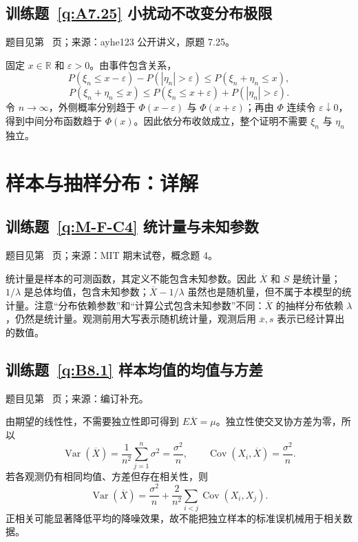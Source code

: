 \documentclass[UTF8,12pt,a4paper,fontset=fandol]{ctexbook}
\begin{document}
\subsection*{训练题~\ref{q:A7.25} 小扰动不改变分布极限}\label{a:A7.25}{\small 题目见第~\pageref{q:A7.25} 页；来源：ayhe123 公开讲义，原题 7.25。}
\begin{solve}固定 $x\in\mathbb R$ 和 $\varepsilon>0$。由事件包含关系，\[P(\xi_n\le x-\varepsilon)-P(|\eta_n|>\varepsilon)\le P(\xi_n+\eta_n\le x),\]\[P(\xi_n+\eta_n\le x)\le P(\xi_n\le x+\varepsilon)+P(|\eta_n|>\varepsilon).\]令 $n\to\infty$，外侧概率分别趋于 $\Phi(x-\varepsilon)$ 与 $\Phi(x+\varepsilon)$；再由 $\Phi$ 连续令 $\varepsilon\downarrow0$，得到中间分布函数趋于 $\Phi(x)$。因此依分布收敛成立，整个证明不需要 $\xi_n$ 与 $\eta_n$ 独立。\end{solve}

\clearpage\section*{样本与抽样分布：详解}

\subsection*{训练题~\ref{q:M-F-C4} 统计量与未知参数}\label{a:M-F-C4}{\small 题目见第~\pageref{q:M-F-C4} 页；来源：MIT 期末试卷，概念题 4。}
\begin{solve}统计量是样本的可测函数，其定义不能包含未知参数。因此 $\overline X$ 和 $S$ 是统计量；$1/\lambda$ 是总体均值，包含未知参数；$\overline X-1/\lambda$ 虽然也是随机量，但不属于本模型的统计量。注意“分布依赖参数”和“计算公式包含未知参数”不同：$\overline X$ 的抽样分布依赖 $\lambda$，仍然是统计量。观测前用大写表示随机统计量，观测后用 $\overline x,s$ 表示已经计算出的数值。\end{solve}

\subsection*{训练题~\ref{q:B8.1} 样本均值的均值与方差}\label{a:B8.1}{\small 题目见第~\pageref{q:B8.1} 页；来源：编订补充。}
\begin{solve}由期望的线性性，不需要独立性即可得到 $E\overline X=\mu$。独立性使交叉协方差为零，所以\[\operatorname{Var}(\overline X)=\frac{1}{n^2}\sum_{j=1}^n\sigma^2=\frac{\sigma^2}{n},\qquad\operatorname{Cov}(X_i,\overline X)=\frac{\sigma^2}{n}.\]若各观测仍有相同均值、方差但存在相关性，则\[\operatorname{Var}(\overline X)=\frac{\sigma^2}{n}+\frac{2}{n^2}\sum_{i<j}\operatorname{Cov}(X_i,X_j).\]正相关可能显著降低平均的降噪效果，故不能把独立样本的标准误机械用于相关数据。\end{solve}
\end{document}

